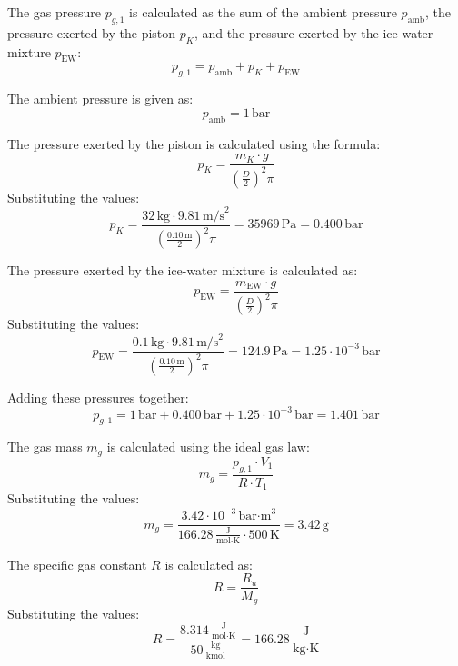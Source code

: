 The gas pressure \( p_{g,1} \) is calculated as the sum of the ambient pressure \( p_{\text{amb}} \), the pressure exerted by the piston \( p_K \), and the pressure exerted by the ice-water mixture \( p_{\text{EW}} \):  
\[
p_{g,1} = p_{\text{amb}} + p_K + p_{\text{EW}}
\]  

The ambient pressure is given as:  
\[
p_{\text{amb}} = 1 \, \text{bar}
\]  

The pressure exerted by the piston is calculated using the formula:  
\[
p_K = \frac{m_K \cdot g}{\left(\frac{D}{2}\right)^2 \pi}
\]  
Substituting the values:  
\[
p_K = \frac{32 \, \text{kg} \cdot 9.81 \, \text{m/s}^2}{\left(\frac{0.10 \, \text{m}}{2}\right)^2 \pi} = 35969 \, \text{Pa} = 0.400 \, \text{bar}
\]  

The pressure exerted by the ice-water mixture is calculated as:  
\[
p_{\text{EW}} = \frac{m_{\text{EW}} \cdot g}{\left(\frac{D}{2}\right)^2 \pi}
\]  
Substituting the values:  
\[
p_{\text{EW}} = \frac{0.1 \, \text{kg} \cdot 9.81 \, \text{m/s}^2}{\left(\frac{0.10 \, \text{m}}{2}\right)^2 \pi} = 124.9 \, \text{Pa} = 1.25 \cdot 10^{-3} \, \text{bar}
\]  

Adding these pressures together:  
\[
p_{g,1} = 1 \, \text{bar} + 0.400 \, \text{bar} + 1.25 \cdot 10^{-3} \, \text{bar} = 1.401 \, \text{bar}
\]  

The gas mass \( m_g \) is calculated using the ideal gas law:  
\[
m_g = \frac{p_{g,1} \cdot V_1}{R \cdot T_1}
\]  
Substituting the values:  
\[
m_g = \frac{3.42 \cdot 10^{-3} \, \text{bar·m}^3}{166.28 \, \frac{\text{J}}{\text{mol·K}} \cdot 500 \, \text{K}} = 3.42 \, \text{g}
\]  

The specific gas constant \( R \) is calculated as:  
\[
R = \frac{R_u}{M_g}
\]  
Substituting the values:  
\[
R = \frac{8.314 \, \frac{\text{J}}{\text{mol·K}}}{50 \, \frac{\text{kg}}{\text{kmol}}} = 166.28 \, \frac{\text{J}}{\text{kg·K}}
\]